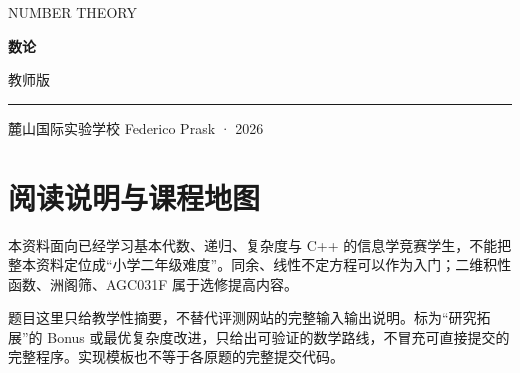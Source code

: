 \documentclass[UTF8,a4paper,11pt,oneside,openany,fontset=fandol]{ctexbook}
\theoremstyle{definition}
\begin{document}
\frontmatter
\begin{titlepage}
\setlength{\parindent}{0pt}
\vspace*{1.2cm}
{\large\color{accent}NUMBER THEORY}\par
\vspace{1cm}
{\fontsize{46}{65}\selectfont\bfseries\color{ink}数论}\par
\vspace{0.5cm}
{\Large 教师版}\par
\vspace{0.5cm}
{\color{accent}\rule{\textwidth}{1.2pt}}\par
\vspace{0.3cm}
\begin{minipage}{0.9\textwidth}
\large 麓山国际实验学校 Federico Prask · 2026
\end{minipage}\par
\vfill
{\normalsize }\par
{\small}
\end{titlepage}
\chapter*{阅读说明与课程地图}

\begin{pitfall}[适用范围与阅读边界]
本资料面向已经学习基本代数、递归、复杂度与 C++ 的信息学竞赛学生，不能把整本资料定位成“小学二年级难度”。同余、线性不定方程可以作为入门；二维积性函数、洲阁筛、AGC031F 属于选修提高内容。

题目这里只给教学性摘要，不替代评测网站的完整输入输出说明。标为“研究拓展”的 Bonus 或最优复杂度改进，只给出可验证的数学路线，不冒充可直接提交的完整程序。实现模板也不等于各原题的完整提交代码。
\end{pitfall}
\end{document}
